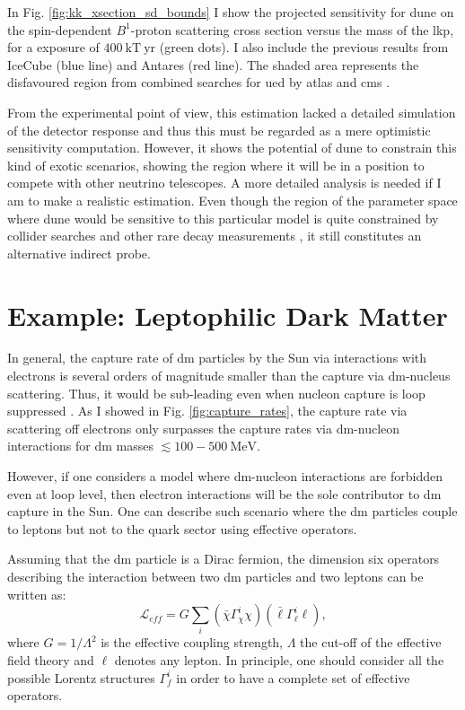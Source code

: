 In Fig. \ref{fig:kk_xsection_sd_bounds} I show the projected sensitivity for \gls{dune} on the spin-dependent $B^{1}$-proton scattering cross section versus the mass of the \gls{lkp}, for a exposure of $400 \ \mathrm{kT}  \ \mathrm{yr}$ (green dots). I also include the previous results from IceCube \cite{Bernadich2019} (blue line) and Antares \cite{Zornoza2012} (red line). The shaded area represents the disfavoured region from combined searches for \gls{ued} by \gls{atlas} and \gls{cms} \cite{Deutschmann2017}.

From the experimental point of view, this estimation lacked a detailed simulation of the detector response and thus this must be regarded as a mere optimistic sensitivity computation. However, it shows the potential of \gls{dune} to constrain this kind of exotic scenarios, showing the region where it will be in a position to compete with other neutrino telescopes. A more detailed analysis is needed if I am to make a realistic estimation. Even though the region of the parameter space where \gls{dune} would be sensitive to this particular model is quite constrained by collider searches \cite{Deutschmann2017} and other rare decay measurements \cite{Haisch2007, Freitas2008}, it still constitutes an alternative indirect probe.

\section{Example: Leptophilic Dark Matter}
\label{sec:dm_analysis_leptophilic_dm}

In general, the capture rate of \gls{dm} particles by the Sun via interactions with electrons is several orders of magnitude smaller than the capture via \gls{dm}-nucleus scattering. Thus, it would be sub-leading even when nucleon capture is loop suppressed \cite{Kopp2009}. As I showed in Fig. \ref{fig:capture_rates}, the capture rate via scattering off electrons only surpasses the capture rates via \gls{dm}-nucleon interactions for \gls{dm} masses $\lesssim 100 - 500 \ \mathrm{MeV}$.

However, if one considers a model where \gls{dm}-nucleon interactions are forbidden even at loop level, then electron interactions will be the sole contributor to \gls{dm} capture in the Sun. One can describe such scenario where the \gls{dm} particles couple to leptons but not to the quark sector using effective operators.

Assuming that the \gls{dm} particle is a Dirac fermion, the dimension six operators describing the interaction between two \gls{dm} particles and two leptons can be written as:
\begin{equation}\label{7.1}
	\mathcal{L}_{eff} = G \sum_{i} \left(\bar{\chi} \Gamma^{i}_{\chi} \chi\right)\left(\bar{\ell} \Gamma^{i}_{\ell} \ell\right),
\end{equation}
where $G=1/\Lambda^{2}$ is the effective coupling strength, $\Lambda$ the cut-off of the effective field theory and $\ell$ denotes any lepton. In principle, one should consider all the possible Lorentz structures $\Gamma^{i}_{f}$ in order to have a complete set of effective operators.

